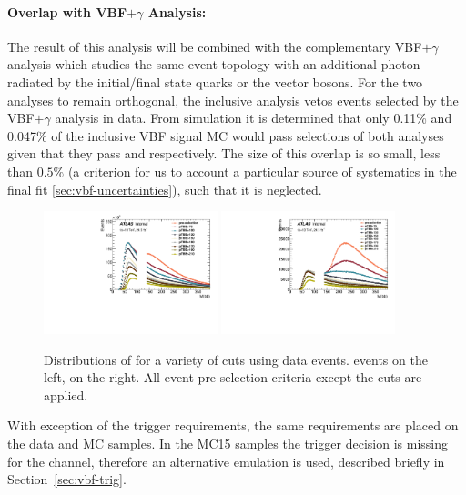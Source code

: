 \paragraph{Overlap with VBF$+\gamma$ Analysis:} The result of this analysis will be combined with the complementary VBF$+\gamma$ analysis which studies the same event topology with an additional photon radiated by the initial/final state quarks or the vector bosons. For the two analyses to remain orthogonal, the inclusive analysis vetos events selected by the VBF$+\gamma$ analysis in data. From simulation it is determined that only 0.11\% and 0.047\% of the inclusive VBF signal MC would pass selections of both analyses given that they pass \twocentral and \fourcentral respectively. The size of this overlap is so small, less than $0.5\%$ (a criterion for us to account a particular source of systematics in the final fit \ref{sec:vbf-uncertainties}), such that it is neglected.  


\begin{figure}[htbp]
  \centering
 \includegraphics[width=0.45\textwidth]{figures/VBF/Presel-Mbb_4cen.pdf}
 \includegraphics[width=0.45\textwidth]{figures/VBF/Presel-Mbb_2cen.pdf}
 \caption{Distributions of \Mbb for a variety of \pTbb cuts using data events.  \fourcentral events on the left, \twocentral on the right.  All event pre-selection criteria except the \pTbb cuts are applied.}
  \label{fig:mbb_ptcuts}
\end{figure}



With exception of the trigger requirements, the same requirements are placed on the data and MC samples.  In the MC15 samples the trigger decision is missing for the \twocentral channel, therefore an alternative emulation is used, described briefly in Section~\ref{sec:vbf-trig}.

